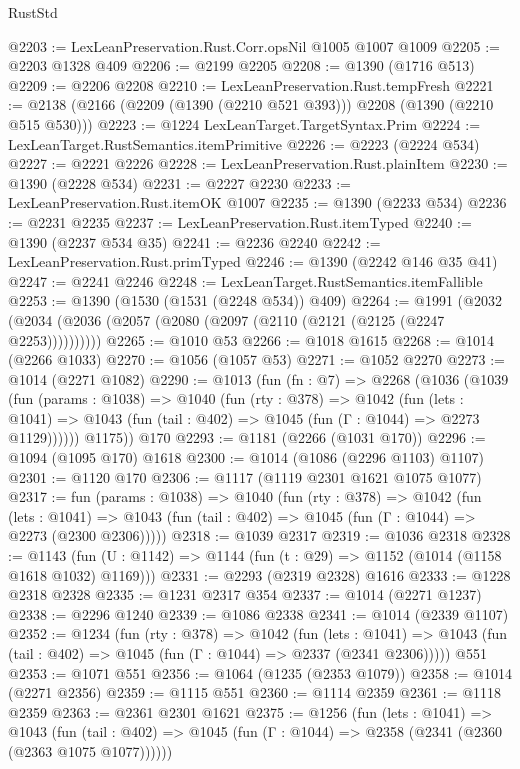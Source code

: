\begin{lexlean}{RustStd}
\begin{coremodule}
@2203 := LexLeanPreservation.Rust.Corr.opsNil @1005 @1007 @1009
@2205 := @2203 @1328 @409
@2206 := @2199 @2205
@2208 := @1390 (@1716 @513)
@2209 := @2206 @2208
@2210 := LexLeanPreservation.Rust.tempFresh
@2221 := @2138 (@2166 (@2209 (@1390 (@2210 @521 @393))) @2208 (@1390 (@2210 @515 @530)))
@2223 := @1224 LexLeanTarget.TargetSyntax.Prim
@2224 := LexLeanTarget.RustSemantics.itemPrimitive
@2226 := @2223 (@2224 @534)
@2227 := @2221 @2226
@2228 := LexLeanPreservation.Rust.plainItem
@2230 := @1390 (@2228 @534)
@2231 := @2227 @2230
@2233 := LexLeanPreservation.Rust.itemOK @1007
@2235 := @1390 (@2233 @534)
@2236 := @2231 @2235
@2237 := LexLeanPreservation.Rust.itemTyped
@2240 := @1390 (@2237 @534 @35)
@2241 := @2236 @2240
@2242 := LexLeanPreservation.Rust.primTyped
@2246 := @1390 (@2242 @146 @35 @41)
@2247 := @2241 @2246
@2248 := LexLeanTarget.RustSemantics.itemFallible
@2253 := @1390 (@1530 (@1531 (@2248 @534)) @409)
@2264 := @1991 (@2032 (@2034 (@2036 (@2057 (@2080 (@2097 (@2110 (@2121 (@2125 (@2247 @2253))))))))))
@2265 := @1010 @53
@2266 := @1018 @1615
@2268 := @1014 (@2266 @1033)
@2270 := @1056 (@1057 @53)
@2271 := @1052 @2270
@2273 := @1014 (@2271 @1082)
@2290 := @1013
    (fun (fn : @7) =>
    @2268
      (@1036
        (@1039
          (fun (params : @1038) =>
          @1040
            (fun (rty : @378) =>
            @1042
              (fun (lets : @1041) =>
              @1043 (fun (tail : @402) => @1045 (fun (Γ : @1044) => @2273 @1129))))))
        @1175))
    @170
@2293 := @1181 (@2266 (@1031 @170))
@2296 := @1094 (@1095 @170) @1618
@2300 := @1014 (@1086 (@2296 @1103) @1107)
@2301 := @1120 @170
@2306 := @1117 (@1119 @2301 @1621 @1075 @1077)
@2317 := fun (params : @1038) =>
  @1040
    (fun (rty : @378) =>
    @1042
      (fun (lets : @1041) =>
      @1043 (fun (tail : @402) => @1045 (fun (Γ : @1044) => @2273 (@2300 @2306)))))
@2318 := @1039 @2317
@2319 := @1036 @2318
@2328 := @1143 (fun (U : @1142) => @1144 (fun (t : @29) => @1152 (@1014 (@1158 @1618 @1032) @1169)))
@2331 := @2293 (@2319 @2328) @1616
@2333 := @1228 @2318 @2328
@2335 := @1231 @2317 @354
@2337 := @1014 (@2271 @1237)
@2338 := @2296 @1240
@2339 := @1086 @2338
@2341 := @1014 (@2339 @1107)
@2352 := @1234
    (fun (rty : @378) =>
    @1042
      (fun (lets : @1041) =>
      @1043 (fun (tail : @402) => @1045 (fun (Γ : @1044) => @2337 (@2341 @2306)))))
    @551
@2353 := @1071 @551
@2356 := @1064 (@1235 (@2353 @1079))
@2358 := @1014 (@2271 @2356)
@2359 := @1115 @551
@2360 := @1114 @2359
@2361 := @1118 @2359
@2363 := @2361 @2301 @1621
@2375 := @1256
    (fun (lets : @1041) =>
    @1043
      (fun (tail : @402) => @1045 (fun (Γ : @1044) => @2358 (@2341 (@2360 (@2363 @1075 @1077))))))

\end{coremodule}
\end{lexlean}

